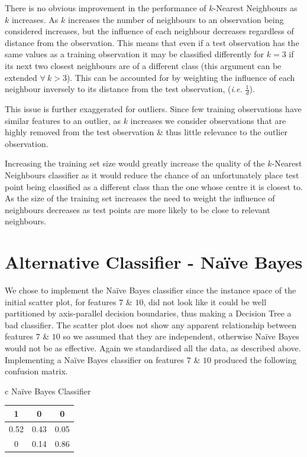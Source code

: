 \documentclass[11pt,a4paper]{article}
\begin{document}
\indent There is no obvious improvement in the performance of $k$-Nearest Neighbours as $k$ increases. As $k$ increases the number of neighbours to an observation being considered increases, but the influence of each neighbour decreases regardless of distance from the observation. This means that even if a test observation has the same values as a training observation it may be classified differently for $k=3$ if its next two closest neighbours are of a different class (this argument can be extended $\forall\ k>3$). This can be accounted for by weighting the influence of each neighbour inversely to its distance from the test observation, (\textit{i.e.} $\frac{1}{d}$).

\indent This issue is further exaggerated for outliers. Since few training observations have similar features to an outlier, as $k$ increases we consider observations that are highly removed from the test observation \& thus little relevance to the outlier observation.

\indent Increasing the training set size would greatly increase the quality of the $k$-Nearest Neighbours classifier as it would reduce the chance of an unfortunately place test point being classified as a different class than the one whose centre it is closest to. As the size of the training set increases the need to weight the influence of neighbours decreases as test points are more likely to be close to relevant neighbours.

\section{Alternative Classifier - Na\"ive Bayes}
We chose to implement the Na\"ive Bayes classifier since the instance space of the initial scatter plot, for features $7$ \& $10$, did not look like it could be well partitioned by axis-parallel decision boundaries, thus making a Decision Tree a bad classifier. The scatter plot does not show any apparent relationship between features $7$ \& $10$ so we assumed that they are independent, otherwise Na\"ive Bayes would not be as effective. Again we standardised all the data, as described above. Implementing a Na\"ive Bayes classifier on features $7$ \& $10$ produced the following confusion matrix.
\begin{center}\begin{tabular}{c}
Na\"ive Bayes Classifier\\
\begin{tabular}{|c|c|c|}
\hline1&0&0\\
\hline0.52&0.43&0.05\\
\hline0&0.14&0.86\\
\hline
\end{tabular}
\end{tabular}\end{center}
\end{document}
